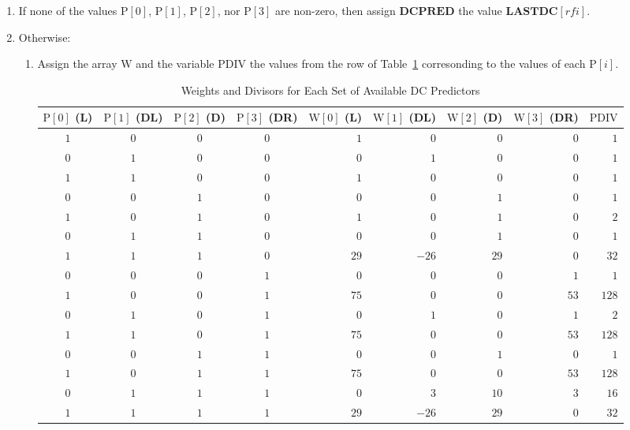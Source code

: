 \documentclass[9pt,letterpaper]{book}
\newcommand{\idx}[1]{{\ensuremath{\mathit{#1}}}}
\newcommand{\rfi}{\idx{rfi}}
\newcommand{\bitvar}[1]{\ensuremath{\mathbf{\bm{#1}}}}
\newcommand{\locvar}[1]{\ensuremath{\mathrm{#1}}}
\numberwithin{equation}{chapter}
\numberwithin{figure}{chapter}
\numberwithin{table}{chapter}
\begin{document}
\begin{enumerate}
\item
If none of the values $\locvar{P}[0]$, $\locvar{P}[1]$, $\locvar{P}[2]$, nor
 $\locvar{P}[3]$ are non-zero, then assign \bitvar{DCPRED} the value
 $\bitvar{LASTDC}[\locvar{\rfi}]$.
\item
Otherwise:
\begin{enumerate}
\item
Assign the array \locvar{W} and the variable \locvar{PDIV} the values from the
 row of Table~\ref{tab:dc-weights} corresonding to the values of each
 $\locvar{P}[\idx{i}]$.

\begin{table}[htb]
\begin{center}
\begin{tabular}{ccccrrrrr}\toprule
\multicolumn{1}{p{25pt}}{\centering$\locvar{P}[0]$ (L)} &
\multicolumn{1}{p{25pt}}{\centering$\locvar{P}[1]$ (DL)} &
\multicolumn{1}{p{25pt}}{\centering$\locvar{P}[2]$ (D)} &
\multicolumn{1}{p{25pt}}{\centering$\locvar{P}[3]$ (DR)} &
\multicolumn{1}{p{25pt}}{\centering$\locvar{W}[0]$ (L)} &
\multicolumn{1}{p{25pt}}{\centering$\locvar{W}[1]$ (DL)} &
\multicolumn{1}{p{25pt}}{\centering$\locvar{W}[2]$ (D)} &
\multicolumn{1}{p{25pt}}{\centering$\locvar{W}[3]$ (DR)} &
\locvar{PDIV} \\\midrule
$1$ & $0$ & $0$ & $0$ &  $1$ &   $0$ &  $0$ &  $0$ &   $1$ \\
$0$ & $1$ & $0$ & $0$ &  $0$ &   $1$ &  $0$ &  $0$ &   $1$ \\
$1$ & $1$ & $0$ & $0$ &  $1$ &   $0$ &  $0$ &  $0$ &   $1$ \\
$0$ & $0$ & $1$ & $0$ &  $0$ &   $0$ &  $1$ &  $0$ &   $1$ \\
$1$ & $0$ & $1$ & $0$ &  $1$ &   $0$ &  $1$ &  $0$ &   $2$ \\
$0$ & $1$ & $1$ & $0$ &  $0$ &   $0$ &  $1$ &  $0$ &   $1$ \\
$1$ & $1$ & $1$ & $0$ & $29$ & $-26$ & $29$ &  $0$ &  $32$ \\
$0$ & $0$ & $0$ & $1$ &  $0$ &   $0$ &  $0$ &  $1$ &   $1$ \\
$1$ & $0$ & $0$ & $1$ & $75$ &   $0$ &  $0$ & $53$ & $128$ \\
$0$ & $1$ & $0$ & $1$ &  $0$ &   $1$ &  $0$ &  $1$ &   $2$ \\
$1$ & $1$ & $0$ & $1$ & $75$ &   $0$ &  $0$ & $53$ & $128$ \\
$0$ & $0$ & $1$ & $1$ &  $0$ &   $0$ &  $1$ &  $0$ &   $1$ \\
$1$ & $0$ & $1$ & $1$ & $75$ &   $0$ &  $0$ & $53$ & $128$ \\
$0$ & $1$ & $1$ & $1$ &  $0$ &   $3$ & $10$ &  $3$ &  $16$ \\
$1$ & $1$ & $1$ & $1$ & $29$ & $-26$ & $29$ &  $0$ &  $32$ \\
\bottomrule\end{tabular}
\end{center}
\caption{Weights and Divisors for Each Set of Available DC Predictors}
\label{tab:dc-weights}
\end{table}


\end{enumerate}
\end{enumerate}
\end{document}
